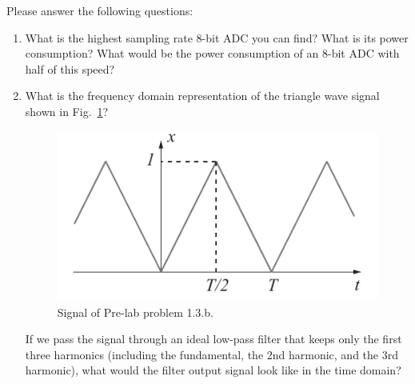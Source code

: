 \documentclass[letterpaper, 11pt]{article}
\begin{document}
\reversemarginpar
{}  Please answer the following questions:
\begin{enumerate}[itemsep=0.1ex, label=\alph*)]
	
	\item What is the highest sampling rate 8-bit ADC you can find? What is its power consumption? What would be the power consumption of an 8-bit ADC with half of this speed?

	\item What is the frequency domain representation of the triangle wave signal shown in Fig.~\ref{fig:prelab132}?
		\begin{figure}[h]
			\centering
			\includegraphics{prelab13b}
			\caption{Signal of Pre-lab problem 1.3.b.}
			\label{fig:prelab132}
		\end{figure}
		
	If we pass the signal through an ideal low-pass filter that keeps only the first three harmonics (including the fundamental, the 2nd harmonic, and the 3rd harmonic), what would the filter output signal look like in the time domain?


\end{enumerate}
\end{document}
